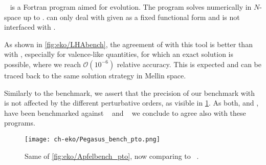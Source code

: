 \pegasus{}~\cite{Vogt:2004ns} is a Fortran program aimed for \pdf{} evolution.
The program solves \dglap{} numerically in $N$-space up to \nnlo{}.
\pegasus{} can only deal with \pdfs given as a fixed functional form and is
not interfaced with \lhapdf{}.

As shown in \cref{fig:eko/LHAbench}, the agreement of \eko{} with this tool is better than with \apfel{},
especially for valence-like quantities, for which an exact solution is possible, where we reach
$\mathcal{O}(10^{-6})$ relative accuracy.
This is expected and can be traced back to the same \dglap{} solution strategy in Mellin space.

Similarly to the \apfel{} benchmark, we assert that the precision of our benchmark with \pegasus{} is not affected
by the different \qcd{} perturbative orders, as visible in \cref{fig:eko/Pegasusbench_pto}.
As both, \apfel{} and \pegasus{}, have been benchmarked against
\hoppet{}~\cite{Salam:2008qg} and \qcdnum{}~\cite{Botje:2010ay} we conclude
to agree also with these programs.

\begin{figure}
    \texttt{[image: ch-eko/Pegasus\_bench\_pto.png]}
    \caption{Same of \cref{fig:eko/Apfelbench_pto}, now comparing to \pegasus{}~\cite{Vogt:2004ns}.
        \label{fig:eko/Pegasusbench_pto} }
\end{figure}
